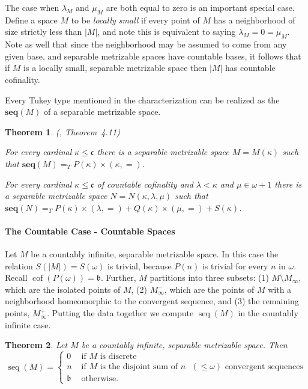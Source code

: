 \documentclass{article}
\newtheorem{thm}{Theorem}[section]
\newcommand{\gte}{=_{T}}
\DeclareMathOperator{\cof}{cof}
\begin{document}
The case when $\lambda_M$ and $\mu_M$ are both equal to zero is an important special case. 
Define a space $M$ to be \emph{locally small} if  every point of $M$ has a neighborhood of size strictly less than $|M|$, and note  
this is equivalent to saying $\lambda_M=0=\mu_M$. 
Note as well that since the neighborhood may be assumed to come from any given base, and separable metrizable spaces have  countable bases, it follows that if $M$ is a locally small, separable metrizable space then $|M|$ has countable cofinality. 

Every Tukey type mentioned in the characterization can be realized as the $\mathbf{seq}(M)$ of a separable metrizable space. 
\begin{thm}\label{th:seq_real}(\cite{FG_Shape}, Theorem~4.11) 

For every cardinal $\kappa \le \mathfrak{c}$ there is a separable metrizable space $M=M(\kappa)$ such that $\mathbf{seq}(M) \gte P(\kappa) \times (\kappa,=)$. 

    For every cardinal $\kappa \le \mathfrak{c}$ of countable cofinality and $\lambda < \kappa$ and $\mu \in \omega+1$ there is a separable metrizable space $N=N(\kappa,\lambda,\mu)$ such that $\mathbf{seq}(N) \gte P(\kappa) \times (\lambda,=) + Q(\kappa) \times (\mu,=) + S(\kappa)$. 
\end{thm}



\paragraph{The Countable Case - Countable Spaces}

Let $M$ be a countably infinite, separable metrizable space. In this case the relation $S(|M|)=S(\omega)$ is trivial, because $P(n)$ is trivial for every $n$ in $\omega$. Recall $\cof(P(\omega))=\mathfrak{b}$. 
Further, $M$ partitions into three subsets: (1) $M\setminus M_\infty$, which are the isolated points of $M$, 
(2) $M_\infty^-$, which are the points of $M$ with a neighborhood homeomorphic to the convergent sequence, 
and (3) the remaining points, $M_\infty^+$. 
Putting the data together we compute $\mathop{seq}(M)$ in the countably infinite case.

\begin{thm}\label{th:seq_ctble} Let $M$ be a countably infinite, separable metrizable space. Then
\[
\mathop{seq}(M) = 
\begin{cases}
  0 & \text{ if $M$ is discrete} \\
  n & \text{ if $M$ is the disjoint sum of $n$ $(\le \omega)$ convergent sequences} \\
  \mathfrak{b} & \text{ otherwise.}
\end{cases}
\]    
\end{thm}
\end{document}
